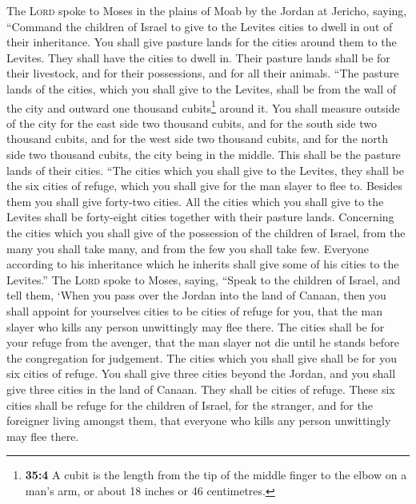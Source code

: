  The \textsc{Lord} spoke to Moses in the plains of Moab by
the Jordan at Jericho, saying,  ``Command the children of
Israel to give to the Levites cities to dwell in out of their
inheritance. You shall give pasture lands for the cities around them to
the Levites.  They shall have the cities to dwell in.
Their pasture lands shall be for their livestock, and for their
possessions, and for all their animals.  ``The pasture
lands of the cities, which you shall give to the Levites, shall be from
the wall of the city and outward one thousand cubits\footnote{\textbf{35:4}
  A cubit is the length from the tip of the middle finger to the elbow
  on a man's arm, or about 18 inches or 46 centimetres.} around it.
 You shall measure outside of the city for the east side
two thousand cubits, and for the south side two thousand cubits, and for
the west side two thousand cubits, and for the north side two thousand
cubits, the city being in the middle. This shall be the pasture lands of
their cities.  ``The cities which you shall give to the
Levites, they shall be the six cities of refuge, which you shall give
for the man slayer to flee to. Besides them you shall give forty-two
cities.  All the cities which you shall give to the
Levites shall be forty-eight cities together with their pasture lands.
 Concerning the cities which you shall give of the
possession of the children of Israel, from the many you shall take many,
and from the few you shall take few. Everyone according to his
inheritance which he inherits shall give some of his cities to the
Levites.''  The \textsc{Lord} spoke to Moses, saying,
 ``Speak to the children of Israel, and tell them, `When
you pass over the Jordan into the land of Canaan,  then
you shall appoint for yourselves cities to be cities of refuge for you,
that the man slayer who kills any person unwittingly may flee there.
 The cities shall be for your refuge from the avenger,
that the man slayer not die until he stands before the congregation for
judgement.  The cities which you shall give shall be for
you six cities of refuge.  You shall give three cities
beyond the Jordan, and you shall give three cities in the land of
Canaan. They shall be cities of refuge.  These six cities
shall be refuge for the children of Israel, for the stranger, and for
the foreigner living amongst them, that everyone who kills any person
unwittingly may flee there.

